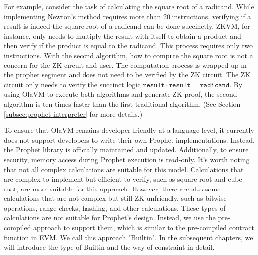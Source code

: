 For example, consider the task of calculating the square root of a radicand. 
While implementing Newton's method requires more than 20 instructions, verifying if a result is indeed the square root of a radicand can be done succinctly.
ZKVM, for instance, only needs to multiply the result with itself to obtain a product and then verify if the product is equal to the radicand. This process requires only two instructions. 
With the second algorithm, how to compute the square root is not a concern for the ZK circuit and user. The computation process is wrapped up in the prophet segment and does not need to be verified by the ZK circuit.
The ZK circuit only needs to verify the succinct logic $\texttt{result} \cdot \texttt{result} = \texttt{radicand}$. 
By using OlaVM to execute both algorithms and generate ZK proof, the second algorithm is ten times faster than the first traditional algorithm. (See Section \ref{subsec:prophet-interpreter} for more details.)

To ensure that OlaVM remains developer-friendly at a language level, it currently does not support developers to write their own Prophet implementations. 
Instead, the Prophet library is officially maintained and updated. Additionally, to ensure security, memory access during Prophet execution is read-only.
It's worth noting that not all complex calculations are suitable for this model. Calculations that are complex to implement but efficient to verify, such as square root and cube root, 
are more suitable for this approach. However, there are also some calculations that are not complex but still ZK-unfriendly, such as bitwise operations, range checks, hashing, and other calculations. 
These types of calculations are not suitable for Prophet's design. Instead, we use the pre-compiled approach to support them, which is similar to the pre-compiled contract function in EVM. 
We call this approach "Builtin". In the subsequent chapters, we will introduce the type of Builtin and the way of constraint in detail.
